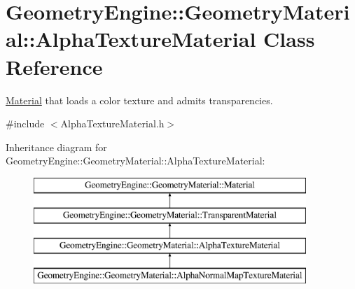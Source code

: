 \hypertarget{class_geometry_engine_1_1_geometry_material_1_1_alpha_texture_material}{}\section{Geometry\+Engine\+::Geometry\+Material\+::Alpha\+Texture\+Material Class Reference}
\label{class_geometry_engine_1_1_geometry_material_1_1_alpha_texture_material}


\mbox{\hyperlink{class_geometry_engine_1_1_geometry_material_1_1_material}{Material}} that loads a color texture and admits transparencies.  




{\ttfamily \#include $<$Alpha\+Texture\+Material.\+h$>$}

Inheritance diagram for Geometry\+Engine\+::Geometry\+Material\+::Alpha\+Texture\+Material\+:\begin{figure}[H]
\begin{center}
\leavevmode
\includegraphics[height=4.000000cm]{class_geometry_engine_1_1_geometry_material_1_1_alpha_texture_material}
\end{center}
\end{figure}
